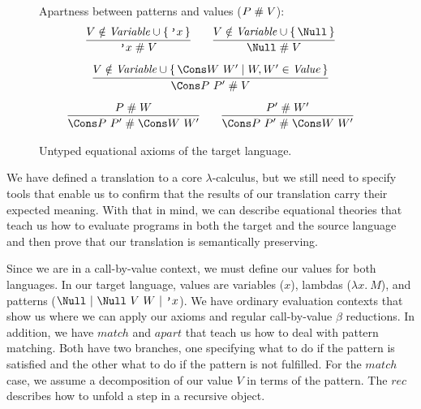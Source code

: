 \begin{figure}[t!]

Apartness between patterns and values ($P \mathrel{\#} V$):
\begin{gather*}
  \infer
  {\q{x} \apart V}
  {V \notin \mathit{Variable} \cup \set{\q{x}}}
  \qquad
  \infer
  {\Null \apart V}
  {V \notin \mathit{Variable} \cup \set{\Null}}
  \\[1ex]
  \infer
  {\Cons P ~ P' \apart V}
  {V \notin \mathit{Variable} \cup \set{\Cons W ~ W' \mid W, W' \in \mathit{Value}}}
  \\[1ex]
  \infer
  {\Cons P ~ P' \apart \Cons W ~ W'}
  {P \apart W}
  \qquad
  \infer
  {\Cons P ~ P' \apart \Cons W ~ W'}
  {P' \apart W'}
\end{gather*}

\caption{Untyped equational axioms of the target language.}
\label{fig:target-equality}
\end{figure}

We have defined a translation to a core $\lambda$-calculus, but we still need to specify tools that enable us to confirm that the results of our translation carry their expected meaning.
With that in mind, we can describe equational theories that teach us how to evaluate programs in both the target and the source language and then prove that our translation is semantically preserving.  

Since we are in a call-by-value context, we must define our values for both languages. In our target language, values are variables ($x$), lambdas ($\lambda x. ~M$), and patterns ($\Null ~|~ \Null ~V ~W ~|~ \q{x} $).
We have ordinary evaluation contexts that show us where we can apply our axioms and regular call-by-value $\beta$ reductions.
In addition, we have $\mathit{match}$ and $\mathit{apart}$ that teach us how to deal with pattern matching.
Both have two branches, one specifying what to do if the pattern is satisfied and the other what to do if the pattern is not fulfilled.
For the $\mathit{match}$ case, we assume a decomposition of our value $V$ in terms of the pattern.
The $\mathit{rec}$ describes how to unfold a step in a recursive object.


